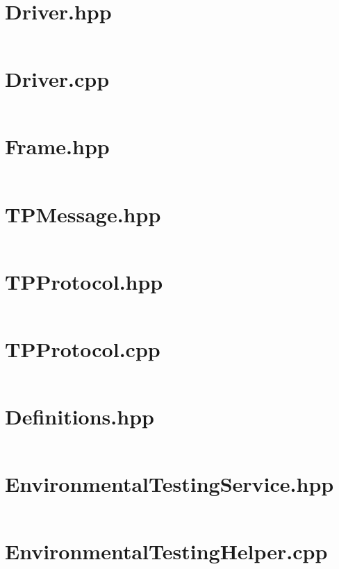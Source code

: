 \documentclass[a4paper,nobib,justified]{tufte-book}
\begin{document}
\section*{Driver.hpp}
\inputminted{cpp}{code/full-files/Driver.hpp}
\newpage
\section*{Driver.cpp}
\inputminted{cpp}{code/full-files/Driver.cpp}
\newpage
\section*{Frame.hpp}
\inputminted{cpp}{code/full-files/Frame.hpp}
\newpage
\section*{TPMessage.hpp}
\inputminted{cpp}{code/full-files/TPMessage.hpp}
\newpage
\section*{TPProtocol.hpp}
\inputminted{cpp}{code/full-files/TPProtocol.hpp}
\newpage
\section*{TPProtocol.cpp}
\inputminted{cpp}{code/full-files/TPProtocol.cpp}
\newpage
\section*{Definitions.hpp}
\inputminted{cpp}{code/full-files/Definitions.hpp}
\newpage
\section*{EnvironmentalTestingService.hpp}
\inputminted{cpp}{code/full-files/EnvironmentalTestingService.hpp}
\newpage
\section*{EnvironmentalTestingHelper.cpp}
\inputminted{cpp}{code/full-files/EnvironmentalTestingHelper.cpp}
\end{document}
